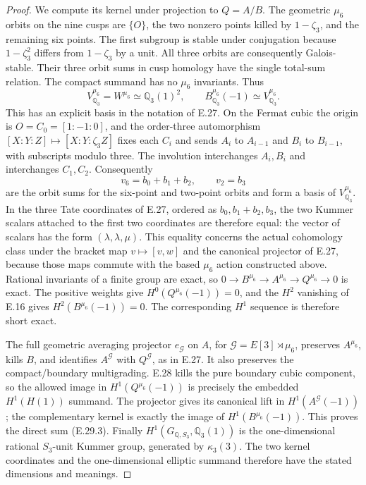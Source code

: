 \documentclass[11pt,oneside]{article}
\begin{document}
\begin{proof}
We compute its kernel under projection to $Q=A/B$.
The geometric $\mu_6$ orbits on the nine cusps
are $\{O\}$, the two nonzero points killed by
$1-\zeta_3$, and the remaining six points.
The first subgroup is stable under conjugation
because $1-\zeta_3^2$ differs from $1-\zeta_3$
by a unit. All three orbits are consequently
Galois-stable. Their three orbit sums in cusp
homology have the single total-sum relation.
The compact summand has no $\mu_6$ invariants.
Thus
\[
 V_{\mathbb Q_3}^{\mu_6}
       =W^{\mu_6}\simeq\mathbb Q_3(1)^2,
 \qquad
 B_{\mathbb Q_3}^{\mu_6}(-1)
       \simeq V_{\mathbb Q_3}^{\mu_6}.
\]
This has an explicit basis in the notation of E.27.
On the Fermat cubic the origin is $O=C_0=[1:-1:0]$,
and the order-three automorphism
$[X:Y:Z]\mapsto[X:Y:\zeta_3 Z]$ fixes each $C_i$
and sends $A_i$ to $A_{i-1}$ and $B_i$ to $B_{i-1}$,
with subscripts modulo three. The involution interchanges
$A_i,B_i$ and interchanges $C_1,C_2$. Consequently
\[
 v_6=b_0+b_1+b_2,
       \qquad v_2=b_3
       \tag{E.29.6}
\]
are the orbit sums for the six-point and two-point orbits
and form a basis of $V_{\mathbb Q_3}^{\mu_6}$.
In the three Tate coordinates of E.27, ordered as
$b_0,b_1+b_2,b_3$, the two Kummer scalars attached
to the first two coordinates are therefore equal:
the vector of scalars has the form $(\lambda,\lambda,\mu)$.
This equality concerns the actual cohomology class under
the bracket map $v\mapsto[v,w]$ and the canonical
projector of E.27, because those maps commute with
the based $\mu_6$ action constructed above.
Rational invariants of a finite group are exact,
so $0\to B^{\mu_6}\to A^{\mu_6}\to Q^{\mu_6}
\to0$ is exact. The positive weights give
$H^0(Q^{\mu_6}(-1))=0$, and the $H^2$ vanishing
of E.16 gives $H^2(B^{\mu_6}(-1))=0$.
The corresponding $H^1$ sequence is therefore
short exact.

The full geometric averaging projector $e_{\mathcal G}$
on $A$, for $\mathcal G=E[3]\rtimes\mu_6$,
preserves $A^{\mu_6}$, kills $B$, and identifies
$A^{\mathcal G}$ with $Q^{\mathcal G}$, as in
E.27. It also preserves the compact/boundary
multigrading. E.28 kills the pure boundary
cubic component, so the allowed image in
$H^1(Q^{\mu_6}(-1))$ is precisely the embedded
$H^1(H(1))$ summand. The projector gives its
canonical lift in $H^1(A^{\mathcal G}(-1))$;
the complementary kernel is exactly the image
of $H^1(B^{\mu_6}(-1))$. This proves the direct
sum (E.29.3). Finally
$H^1(G_{\mathbb Q,S_3},\mathbb Q_3(1))$
is the one-dimensional rational $S_3$-unit
Kummer group, generated by $\kappa_3(3)$.
The two kernel coordinates and the one-dimensional
elliptic summand therefore have the stated
dimensions and meanings.
\end{proof}
\end{document}
